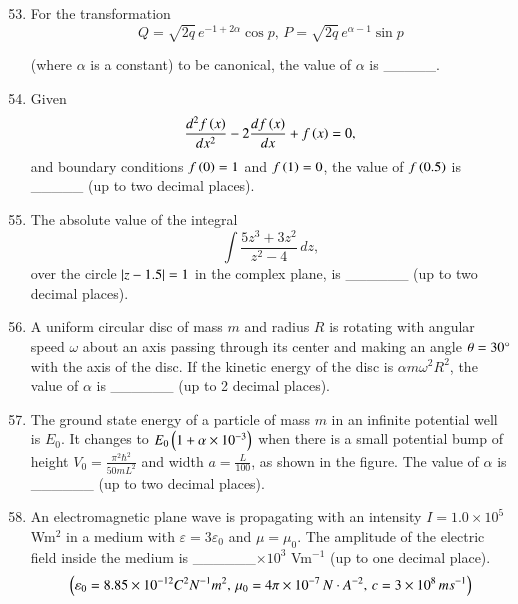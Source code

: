 \documentclass[journal,9pt,onecolumn]{IEEEtran}
\begin{document}
\begin{enumerate}
\setcounter{enumi}{52}
\item For the transformation $$Q = \sqrt{2q} \, e^{-1+2\alpha} \cos p,\, P = \sqrt{2q} \, e^{\alpha-1} \sin p$$

(where $\alpha$ is a constant) to be canonical, the value of $\alpha$ is \_\_\_\_\_.
\hfill {}

\item Given $$\frac{d^2 f\left(x\right)}{dx^2} - 2 \frac{df\left(x\right)}{dx} + f\left(x\right) = 0,$$
and boundary conditions $f\left(0\right) = 1$ and $f\left(1\right) = 0$, the value of $f\left(0.5\right)$ is \_\_\_\_\_ (up to two decimal places).\hfill {}



\item The absolute value of the integral $$\int \frac{5z^3 + 3z^2}{z^2 - 4} \, dz,$$
over the circle $\left\vert z - 1.5\right\vert = 1$ in the complex plane, is \_\_\_\_\_\_ (up to two decimal places).\hfill {}


\item A uniform circular disc of mass $m$ and radius $R$ is rotating with angular speed $\omega$ about an axis passing through its center and making an angle $\theta = 30\degree$ with the axis of the disc. If the kinetic energy of the disc is $\alpha m \omega^2 R^2$, the value of $\alpha$ is \_\_\_\_\_\_ (up to 2 decimal places).\hfill {}
\begin{center}
    
\end{center}

\item The ground state energy of a particle of mass $m$ in an infinite potential well is $E_0$. It changes to $E_0 \left(1 + \alpha \times 10^{-3}\right)$ when there is a small potential bump of height $V_0 = \frac{\pi^2 \hbar^2}{50 m L^2}$ and width $a = \frac{L}{100}$, as shown in the figure. The value of $\alpha$ is \_\_\_\_\_\_ (up to two decimal places).\hfill {}
\begin{center}
    
\end{center}

\item An electromagnetic plane wave is propagating with an intensity $I = 1.0 \times 10^5$ Wm$^2$ in a medium with $\varepsilon = 3\varepsilon_0$ and $\mu = \mu_0$. The amplitude of the electric field inside the medium is \_\_\_\_\_\_$ \times 10^3$ Vm$^{-1}$ (up to one decimal place).\hfill {}
$$
\left(\varepsilon_0 = 8.85 \times 10^{-12} {C}^2N^{-1}m^2, \, \mu_0 = 4\pi \times 10^{-7} \, N\cdot A^{-2}, \, c = 3 \times 10^8 \, ms^{-1}\right)
$$


\end{enumerate}
\end{document}
